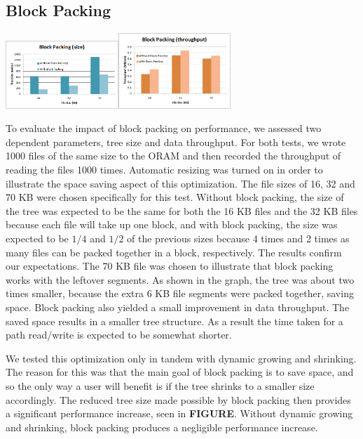 \documentclass[conference]{IEEEtran}
\begin{document}
\subsection{Block Packing}
\begin{center}
\noindent\includegraphics[width=4.25cm]{550.png}\includegraphics[width=4.25cm]{551.png}
\end{center}

To evaluate the impact of block packing on performance, we assessed two dependent parameters, tree size and data throughput. For both tests, we wrote 1000 files of the same size to the ORAM and then recorded the throughput of reading the files 1000 times. Automatic resizing was turned on in order to illustrate the space saving aspect of this optimization. The file sizes of 16, 32 and 70 KB were chosen specifically for this test. Without block packing, the size of the tree was expected to be the same for both the 16 KB files and the 32 KB files because each file will take up one block, and with block packing, the size was expected to be $1/4$ and $1/2$ of the previous sizes because 4 times and 2 times as many files can be packed together in a block, respectively. The results confirm our expectations. The 70 KB file was chosen to illustrate that block packing works with the leftover segments. As shown in the graph, the tree was about two times smaller, because the extra 6 KB file segments were packed together, saving space. Block packing also yielded a small improvement in data throughput. The saved space results in a smaller tree structure. As a result the time taken for a path read/write is expected to be somewhat shorter.

We tested this optimization only in tandem with dynamic growing and shrinking. The reason for this was that the main goal of block packing is to save space, and so the only way a user will benefit is if the tree shrinks to a smaller size accordingly. The reduced tree size made possible by block packing then provides a significant performance increase, seen in {\bf FIGURE}. Without dynamic growing and shrinking, block packing produces a negligible performance increase.
\end{document}
